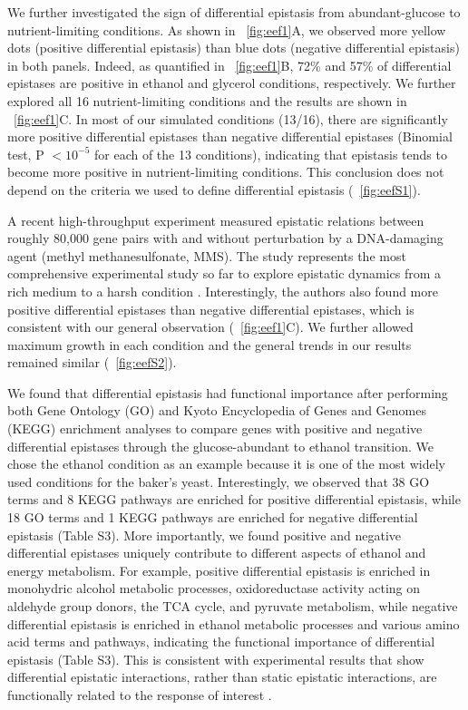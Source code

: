 We further investigated the sign of differential epistasis from
abundant-glucose to nutrient-limiting conditions. As shown in \Fig~\ref{fig:eef1}A, 
we observed more yellow dots (positive differential epistasis)
than blue dots (negative differential epistasis) in both
panels. Indeed, as quantified in \Fig~\ref{fig:eef1}B, 72\% and 57\% of
differential epistases are positive in ethanol and glycerol
conditions, respectively. We further explored all 16 nutrient-limiting
conditions and the results are shown in \Fig~\ref{fig:eef1}C. In most of our
simulated conditions (13/16), there are significantly more positive
differential epistases than negative differential epistases (Binomial
test, P $< 10^{-5}$ for each of the 13 conditions), indicating that
epistasis tends to become more positive in nutrient-limiting
conditions. This conclusion does not depend on the criteria we used to
define differential epistasis (\Fig~\ref{fig:eefS1}).

A recent high-throughput experiment measured epistatic relations
between roughly 80,000 gene pairs with and without perturbation by a
DNA-damaging agent (methyl methanesulfonate, MMS). The study
represents the most comprehensive experimental study so far to explore
epistatic dynamics from a rich medium to a harsh condition
\citep{Bandyopadhyay2011}. Interestingly, the authors also found more
positive differential
epistases than negative differential epistases, which is consistent
with our general observation (\Fig~\ref{fig:eef1}C). We further allowed maximum
growth in each condition and the general trends in our results
remained similar (\Fig~\ref{fig:eefS2}).

We found that differential epistasis had functional importance after
performing both Gene Ontology (GO) and Kyoto Encyclopedia of Genes and
Genomes (KEGG) enrichment analyses to compare genes with positive and
negative differential epistases through the glucose-abundant to
ethanol transition. We chose the ethanol condition as an example
because it is one of the most widely used conditions for the baker's
yeast. Interestingly, we observed that 38 GO terms and 8 KEGG pathways
are enriched for positive differential epistasis, while 18 GO terms
and 1 KEGG pathways are enriched for negative differential epistasis
(Table S3). More importantly, we found positive and negative
differential epistases uniquely contribute to different aspects of
ethanol and energy metabolism. For example, positive differential
epistasis is enriched in monohydric alcohol metabolic processes,
oxidoreductase activity acting on aldehyde group donors, the TCA
cycle, and pyruvate metabolism, while negative differential epistasis
is enriched in ethanol metabolic processes and various amino acid
terms and pathways, indicating the functional importance of
differential epistasis (Table S3). This is consistent with
experimental results that show differential epistatic interactions,
rather than static epistatic interactions, are functionally related to
the response of interest \citep{Bandyopadhyay2011}.

